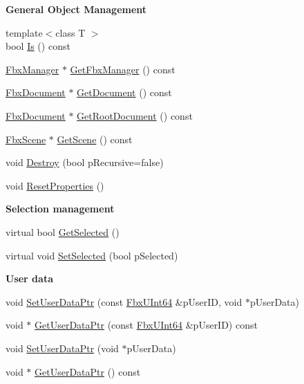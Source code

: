 \begin{Indent}\textbf{ General Object Management}\par
\begin{DoxyCompactItemize}
\item 
{\footnotesize template$<$class T $>$ }\\bool \hyperlink{class_fbx_object_a65e47d62ed950247cd097b3b505d7b48}{Is} () const
\item 
\hyperlink{class_fbx_manager}{Fbx\+Manager} $\ast$ \hyperlink{class_fbx_object_aa9871c290d977c2ef1c268193699863c}{Get\+Fbx\+Manager} () const
\item 
\hyperlink{class_fbx_document}{Fbx\+Document} $\ast$ \hyperlink{class_fbx_object_a4751c8d1f4156ed658f5b3473cad367a}{Get\+Document} () const
\item 
\hyperlink{class_fbx_document}{Fbx\+Document} $\ast$ \hyperlink{class_fbx_object_a35553dcf1f5290c92b10c7246a5d685b}{Get\+Root\+Document} () const
\item 
\hyperlink{class_fbx_scene}{Fbx\+Scene} $\ast$ \hyperlink{class_fbx_object_a2e76cc1e34a8474a4dddd7dee28e04c2}{Get\+Scene} () const
\item 
void \hyperlink{class_fbx_object_a7b49e6a0c17132cd7e2e7e8485a08915}{Destroy} (bool p\+Recursive=false)
\item 
void \hyperlink{class_fbx_object_af8626c123cf302297bdecb4c8d62db99}{Reset\+Properties} ()
\end{DoxyCompactItemize}
\end{Indent}
\begin{Indent}\textbf{ Selection management}\par
\begin{DoxyCompactItemize}
\item 
virtual bool \hyperlink{class_fbx_object_ade0dddb02e39f6823d0bea6071ef4410}{Get\+Selected} ()
\item 
virtual void \hyperlink{class_fbx_object_ab61c3e576aaf899deda673702c0a1b79}{Set\+Selected} (bool p\+Selected)
\end{DoxyCompactItemize}
\end{Indent}
\begin{Indent}\textbf{ User data}\par
\begin{DoxyCompactItemize}
\item 
void \hyperlink{class_fbx_object_ac37f77806bfd54d6a41ca6158768deb0}{Set\+User\+Data\+Ptr} (const \hyperlink{fbxtypes_8h_a9beeca85cdc9941e912fe9eac7709b53}{Fbx\+U\+Int64} \&p\+User\+ID, void $\ast$p\+User\+Data)
\item 
void $\ast$ \hyperlink{class_fbx_object_a434f9f31f49ddea0ce7248a75bbed30a}{Get\+User\+Data\+Ptr} (const \hyperlink{fbxtypes_8h_a9beeca85cdc9941e912fe9eac7709b53}{Fbx\+U\+Int64} \&p\+User\+ID) const
\item 
void \hyperlink{class_fbx_object_af52325b1b5f2f1f5884d5d14d80c1922}{Set\+User\+Data\+Ptr} (void $\ast$p\+User\+Data)
\item 
void $\ast$ \hyperlink{class_fbx_object_ae1580cc0f041cf81bf0a3a96c4e00554}{Get\+User\+Data\+Ptr} () const
\end{DoxyCompactItemize}
\end{Indent}
